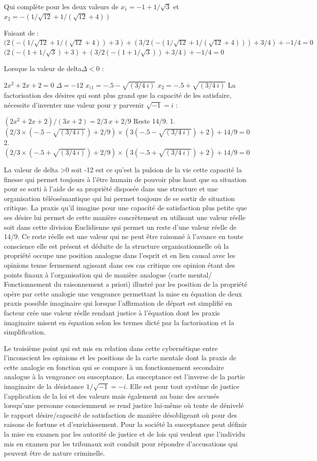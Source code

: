 \documentclass[12pt,letterpaper,oneside]{article}
\begin{document}
Qui complète pour les deux valeurs de $x_1=-1+1/\sqrt{3}$  et $x_2=-(1/\sqrt{12}+1/(\sqrt{12}+4))$

Faisant de :
$(2(-(1/\sqrt{12}+1/(\sqrt{12}+4))+3)+(3/2(-(1/\sqrt{12}+1/(\sqrt{12}+4)))+3/4)+-1/4=0$
$(2(-(1+1/\sqrt{3})+3)+(3/2(-(1+1/\sqrt{3}))+3/4)+-1/4=0$

Lorsque la valeur de delta$\Delta<0$ :

$2x^2+2x+2=0$
$\Delta=-12$
$x_{(1}=-.5-\sqrt{(3/4\ i)}$
$x_2=-.5+\sqrt{(3/4\ i)}$
La factorisation des désires qui sont plus grand que la capacité de les satisfaire, nécessite d’inventer une valeur pour y parvenir $\sqrt{-1}=i$ :

$(2x^2+2x+2)/(3x+2)=2/3\ x+2/9$  Reste 14/9.
1.$(2/3\times(-.5-\sqrt{(3/4\ i)})+2/9)\times(3(-.5-\sqrt{(3/4\ i)})+2)+14/9=0$
2.$(2/3\times(-.5+\sqrt{(3/4\ i)})+2/9)\times(3(-.5+\sqrt{(3/4\ i)})+2)+14/9=0$

La valeur de delta >0 soit -12 est ce qu’est la pulsion de la vie cette capacité la finesse qui permet toujours à l’être humain de pouvoir plus haut que sa situation pour se sorti à l’aide de sa propriété disposée dans une structure et une organisation téléosémantique qui lui permet toujours de se sortir de situation critique. La praxis qu’il imagine pour une capacité de satisfaction plus petite que ses désire lui permet de cette manière concrètement en utilisant une valeur réelle soit dans cette division Euclidienne qui permet un reste d’une valeur réelle de 14/9. Ce reste réelle est une valeur qui ne peut être raisonné à l’avance en toute conscience elle est présent et déduite de la structure organisationnelle  où la propriété occupe une position analogue dans l’esprit et en lien causal avec les opinions tenue fermement agissant dans ces cas critique ces opinion étant des points finaux à l’organisation qui de manière analogue (carte mental/ Fonctionnement du raisonnement a priori) illustré par les position de la propriété opère par cette analogie une vengeance permettant la mise en équation de deux praxis possible imaginaire qui lorsque l’affirmation de départ est simplifié en facteur crée une valeur réelle rendant justice à l’équation dont les praxis imaginaire misent en équation selon les termes dicté par la factorisation et la simplification.

Le troisième point qui est mis en relation dans cette cybernétique entre l’inconscient les opinions et les positions de la carte mentale dont la praxis de cette analogie en fonction qui se compare à un fonctionnement secondaire analogue à la vengeance ou susceptance. La susceptance est l’inverse de la partie imaginaire de la désistance $1/\sqrt{-1}=-i$. Elle est pour tout système de justice l’application de la loi et des valeurs mais également au banc des accusés lorsqu’une personne consciemment se rend justice lui-même où tente de dénivelé le rapport désire/capacité de satisfaction de manière désobligeant où pour des raisons de fortune et d’enrichissement. Pour la société la susceptance peut définir la mise en examen par les autorité de justice et de lois qui veulent que l’individu mis en examen par les tribunaux soit conduit pour répondre d’accusations qui peuvent être de nature criminelle.
\end{document}
